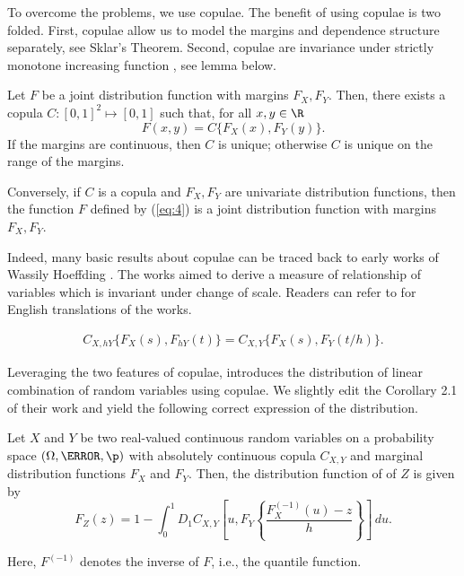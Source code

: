To overcome the problems, we use copulae.
The benefit of using copulae is two folded.
First, copulae allow us to model the margins and dependence structure separately, see Sklar's Theorem.
Second, copulae are invariance under strictly monotone increasing function \citep{schweizer1981nonparametric}, see lemma below.

\begin{theorem}
  Let $F$ be a joint distribution function with margins $F_X,
  F_Y$. Then, there exists a copula $C:[0,1]^2 \mapsto [0,1]$ such
  that, for all $x,y\in \R$
  \begin{equation}
    \label{eq:4}
    F(x,y)=C\{F_X(x), F_Y(y)\}.
  \end{equation}
  If the margins are continuous, then $C$ is unique; otherwise $C$ is
  unique on the range of the margins.

  Conversely, if $C$ is a copula and $F_X, F_Y$ are univariate
  distribution functions, then the function $F$ defined by (\ref{eq:4})
  is a joint distribution function with margins $F_X, F_Y$.
\end{theorem}

Indeed, many basic results about copulae can be traced back to early works of Wassily Hoeffding \citep{hoedffding1940, hoedffding1941}.
The works aimed to derive a measure of relationship of variables which is invariant under change of scale.
Readers can refer to \citet{hoeffding2012collected} for English translations of the works.

\begin{lemma}
  \begin{align}
  C_{X, hY}\{F_X(s),F_{hY}(t)\} = C_{X, Y}\{F_X(s),F_{Y}(t/h)\}.
    \end{align}
  \end{lemma}


Leveraging the two features of copulae, \citet{barbi2014copula} introduces the distribution of linear combination of random variables using copulae.
We slightly edit the Corollary 2.1 of their work and yield the following correct expression of the distribution.

\begin{proposition}
  \label{prop:dfrh}
  Let $X$ and $Y$ be two real-valued continuous random
  variables on a
  probability space $(\Omega, \F, \p)$ with
  absolutely continuous copula $C_{X, Y}$ and marginal distribution functions $F_{X}$
  and $F_{Y}$. Then, the distribution function of of $Z$ is given by 
  \begin{equation}
    \label{eq:3}
    F_{Z}(z) = 1- \int^1_0 D_1 C_{X, Y}
    \left[ u, F_{Y} \left\{ \frac{F^{(-1)}_{X}(u)-z}{h} \right\}
    \right]\, d u.
  \end{equation}
\end{proposition}
Here, $F^{(-1)}$ denotes the inverse of $F$, i.e., the quantile
function. \medskip

